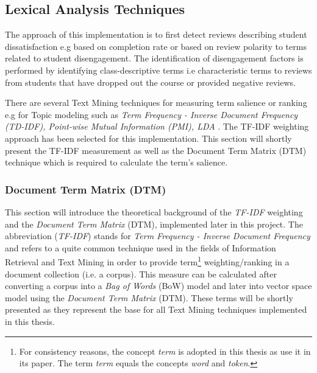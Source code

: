 \documentclass[
	a4paper,
	pdftex,
	12pt,	
	footinclude=true,
	fleqn,
	final,
	]{report}%
\begin{document}
\vspace{-0.45cm}
\subsection{Lexical Analysis Techniques}
\vspace{-0.3cm}
The approach of this implementation is to first detect 
reviews describing student dissatisfaction 
e.g based on completion rate or 
based on review polarity to 
terms related to student disengagement.
The identification of disengagement factors is 
performed by identifying class-descriptive terms 
i.e characteristic terms to reviews from students
that have dropped out the course or provided
negative reviews.

There are several Text Mining techniques
for measuring term salience or ranking
e.g for Topic modeling such as \emph{Term Frequency - Inverse Document Frequency (TD-IDF), 
Point-wise Mutual Information (PMI), LDA }.
The TF-IDF weighting approach has been selected 
for this implementation. This section will
shortly present the TF-IDF measurement as well as the 
Document Term Matrix (DTM) 
technique which is required to 
calculate the term's salience.

\vspace{-0.45cm}
\subsubsection*{Document Term Matrix (DTM)}
\label{sec:tdf} 
\vspace{-0.3cm}

This section will introduce the theoretical background of the \emph{TF-IDF} weighting and the 
\emph{Document Term Matrix} (DTM), implemented later in this project. 
The abbreviation (\emph{TF-IDF}) stands for \emph{Term Frequency - Inverse Document 
Frequency} and refers to a quite common technique used in the fields of Information Retrieval
and Text Mining in order to provide term\footnote{For consistency reasons, the concept \emph{term} 
is adopted in this thesis as \cite{Pang2002} use it in its paper. The term \emph{term} equals the 
concepts \emph{word} and \emph{token}.} weighting/ranking in a document collection (i.e. a corpus). 
This measure can be calculated after converting a corpus into 
a \emph{Bag of Words} (BoW) model \cite{Manning2008} and 
later into vector space model using the \emph{Document Term Matrix} (DTM). 
These terms will be shortly presented as they represent the base for all
Text Mining techniques implemented in this thesis.
\end{document}
